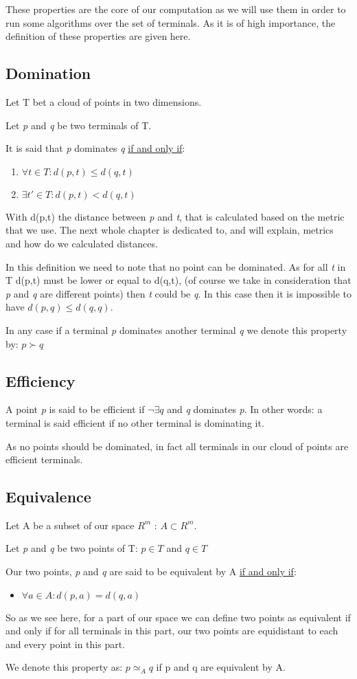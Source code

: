These properties are the core of our computation as we will use them in order to run some algorithms over the set of terminals. As it is of high importance, the definition of these properties are given here. 
\subsection{Domination} %
Let T bet a cloud of points in two dimensions.

Let \emph{p} and \emph{q} be two terminals of T.

\noindent It is said that \emph{p} dominates \emph{q} \underline{if and only if}:
\begin{enumerate}
	\item{$\forall t \in T : d(p,t) \leq d(q,t)$}
	\item{$\exists t' \in T : d(p,t) < d(q,t)$}
\end{enumerate} 
With d(p,t) the distance between \emph{p} and \emph{t}, that is calculated based on the metric that we use. The next whole chapter is dedicated to, and will explain, metrics and how do we calculated distances.

In this definition we need to note that no point can be dominated. As for all \emph{t} in T d(p,t) must be lower or equal to d(q,t), (of course we take in consideration that \emph{p} and \emph{q} are different points) then \emph{t} could be \emph{q}. In this case then it is impossible to have $d(p,q)\leq d(q,q)$.

In any case if a terminal \emph{p} dominates another terminal \emph{q} we denote this property by: $ p \succ q $
\subsection{Efficiency}%
A point \emph{p} is said to be efficient if $\neg\exists q$ and \emph{q} dominates \emph{p}. In other words: a terminal is said efficient if no other terminal is dominating it.

As no points should be dominated, in fact all terminals in our cloud of points are efficient terminals.
\subsection{Equivalence} %
Let A be a subset of  our space $R^m$ : $A \subset R^m$.

Let \emph{p} and \emph{q} be two points of T: $p \in T$ and $q \in T$

\noindent Our two points, \emph{p} and \emph{q} are said to be equivalent by A \underline{if and only if}:
\begin{itemize}[noitemsep, nolistsep]
	\item{$\forall a \in A : d(p,a) = d(q,a)$}
\end{itemize} 

So as we see here, for a part of our space we can define two points as equivalent if and only if for all terminals in this part, our two points are equidistant to each and every point in this part.

We denote this property as: $p \simeq_{A} q$ if p and q are equivalent by A.